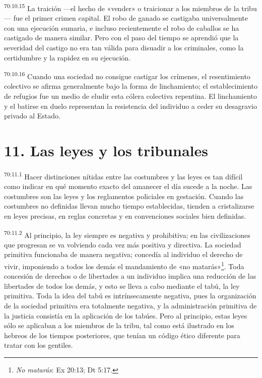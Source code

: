 \par
\textsuperscript{70:10.15} La traición ---el hecho de «vender» o traicionar a los miembros de la tribu--- fue el primer crimen capital. El robo de ganado se castigaba universalmente con una ejecución sumaria, e incluso recientemente el robo de caballos se ha castigado de manera similar. Pero con el paso del tiempo se aprendió que la severidad del castigo no era tan válida para disuadir a los criminales, como la certidumbre y la rapidez en su ejecución.

\par
\textsuperscript{70:10.16} Cuando una sociedad no consigue castigar los crímenes, el resentimiento colectivo se afirma generalmente bajo la forma de linchamiento; el establecimiento de refugios fue un medio de eludir esta cólera colectiva repentina. El linchamiento y el batirse en duelo representan la resistencia del individuo a ceder su desagravio privado al Estado.

\section*{11. Las leyes y los tribunales}
\par
\textsuperscript{70:11.1} Hacer distinciones nítidas entre las costumbres y las leyes es tan difícil como indicar en qué momento exacto del amanecer el día sucede a la noche. Las costumbres son las leyes y los reglamentos policiales en gestación. Cuando las costumbres no definidas llevan mucho tiempo establecidas, tienden a cristalizarse en leyes precisas, en reglas concretas y en convenciones sociales bien definidas.

\par
\textsuperscript{70:11.2} Al principio, la ley siempre es negativa y prohibitiva; en las civilizaciones que progresan se va volviendo cada vez más positiva y directiva. La sociedad primitiva funcionaba de manera negativa; concedía al individuo el derecho de vivir, imponiendo a todos los demás el mandamiento de «no matarás»\footnote{\textit{No matarás}: Ex 20:13; Dt 5:17.}. Toda concesión de derechos o de libertades a un individuo implica una reducción de las libertades de todos los demás, y esto se lleva a cabo mediante el tabú, la ley primitiva. Toda la idea del tabú es intrínsecamente negativa, pues la organización de la sociedad primitiva era totalmente negativa, y la administración primitiva de la justicia consistía en la aplicación de los tabúes. Pero al principio, estas leyes sólo se aplicaban a los miembros de la tribu, tal como está ilustrado en los hebreos de los tiempos posteriores, que tenían un código ético diferente para tratar con los gentiles.

